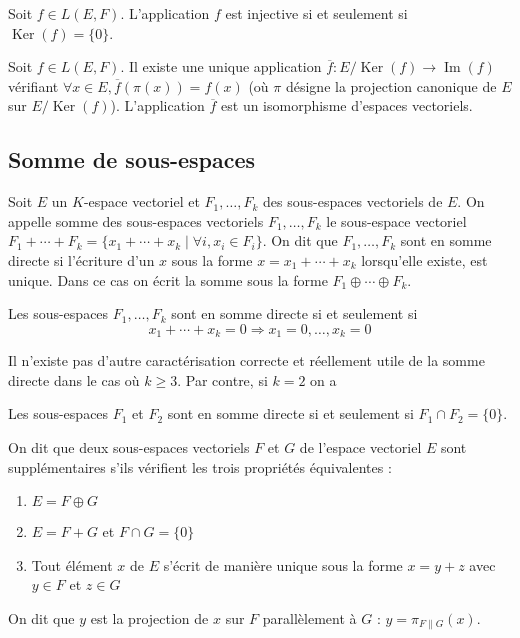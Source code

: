 \begin{thm}
Soit $f \in L(E,F)$. L'application $f$ est injective si et seulement si $\operatorname{Ker}(f) = \{0\}$.
\end{thm}

\begin{thm}
Soit $f \in L(E,F)$. Il existe une unique application $\overline{f} : E/\operatorname{Ker}(f) \to \operatorname{Im}(f)$ vérifiant $\forall x \in E, \overline{f}(\pi(x)) = f(x)$ (où $\pi$ désigne la projection canonique de $E$ sur $E/\operatorname{Ker}(f)$). L'application $\overline{f}$ est un isomorphisme d'espaces vectoriels.
\end{thm}

\subsection{Somme de sous-espaces}

\begin{de}
Soit $E$ un $K$-espace vectoriel et $F_1,\ldots,F_k$ des sous-espaces vectoriels de $E$. On appelle somme des sous-espaces vectoriels $F_1,\ldots,F_k$ le sous-espace vectoriel $F_1 + \cdots + F_k = \{x_1 + \cdots + x_k \mid \forall i, x_i \in F_i\}$. On dit que $F_1,\ldots,F_k$ sont en somme directe si l'écriture d'un $x$ sous la forme $x = x_1 + \cdots + x_k$ lorsqu'elle existe, est unique. Dans ce cas on écrit la somme sous la forme $F_1 \oplus \cdots \oplus F_k$.
\end{de}

\begin{thm}
Les sous-espaces $F_1,\ldots,F_k$ sont en somme directe si et seulement si 
\[ x_1 + \cdots + x_k = 0 \Rightarrow x_1 = 0,\ldots,x_k = 0 \]
\end{thm}

\begin{rem}
Il n'existe pas d'autre caractérisation correcte et réellement utile de la somme directe dans le cas où $k \geq 3$. Par contre, si $k = 2$ on a
\end{rem}

\begin{thm}
Les sous-espaces $F_1$ et $F_2$ sont en somme directe si et seulement si $F_1 \cap F_2 = \{0\}$.
\end{thm}

\begin{de}
On dit que deux sous-espaces vectoriels $F$ et $G$ de l'espace vectoriel $E$ sont supplémentaires s'ils vérifient les trois propriétés équivalentes :
\begin{enumerate}
\item $E = F \oplus G$
\item $E = F + G$ et $F \cap G = \{0\}$
\item Tout élément $x$ de $E$ s'écrit de manière unique sous la forme $x = y + z$ avec $y \in F$ et $z \in G$
\end{enumerate}
On dit que $y$ est la projection de $x$ sur $F$ parallèlement à $G$ : $y = \pi_{F\parallel G}(x)$.
\end{de}

